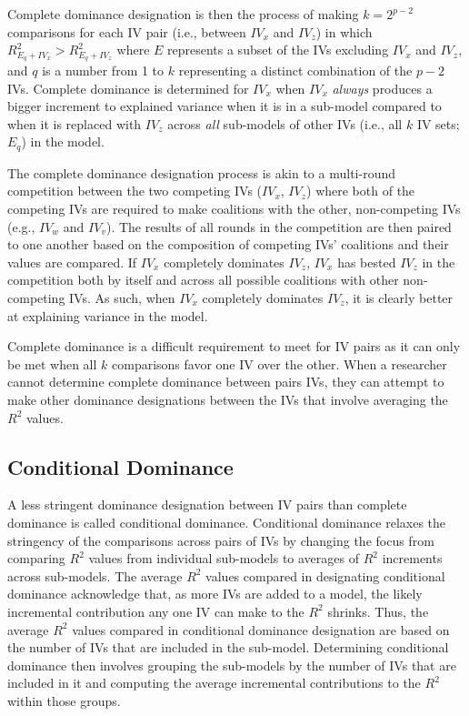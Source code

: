 \documentclass[ShortAfour,times,sageapa]{sagej}
\begin{document}
	Complete dominance designation is then the process of making $k = 2^{p - 2}$ comparisons for each IV pair (i.e., between $IV_x$ and $IV_z$) in which $R^2_{E_q + IV_x} > R^2_{E_q + IV_z}$ where $E$ represents a subset of the IVs excluding $IV_x$ and $IV_z$, and $q$ is a number from 1 to $k$ representing a distinct combination of the $p - 2$ IVs.
	Complete dominance is determined for $IV_x$ when $IV_x$ \emph{always} produces a bigger increment to explained variance when it is in a sub-model compared to when it is replaced with $IV_z$ across \emph{all} sub-models of other IVs (i.e., all $k$ IV sets; $E_q$) in the model. 
	
	The complete dominance designation process is akin to a multi-round competition between the two competing IVs ($IV_x$, $IV_z$) where both of the competing IVs are required to make coalitions with the other, non-competing IVs (e.g., $IV_w$ and $IV_v$). 
	The results of all rounds in the competition are then paired to one another based on the composition of competing IVs' coalitions and their values are compared.
	If $IV_x$ completely dominates $IV_z$, $IV_x$ has bested $IV_z$ in the competition both by itself and across all possible coalitions with other non-competing IVs. 
	As such, when $IV_x$ completely dominates $IV_z$, it is clearly better at explaining variance in the model.
	
	Complete dominance is a difficult requirement to meet for IV pairs as it can only be met when all $k$ comparisons favor one IV over the other.
	When a researcher cannot determine complete dominance between pairs IVs, they can attempt to make other dominance designations between the IVs that involve averaging the $R^2$ values.
	
	\subsection{Conditional Dominance}
	
	A less stringent dominance designation between IV pairs than complete dominance is called conditional dominance.
	Conditional dominance relaxes the stringency of the comparisons across pairs of IVs by changing the focus from comparing $R^2$ values from individual sub-models to averages of $R^2$ increments across sub-models.
	The average $R^2$ values compared in designating conditional dominance acknowledge that, as more IVs are added to a model, the likely incremental contribution any one IV can make to the $R^2$ shrinks.
	Thus, the average $R^2$ values compared in conditional dominance designation are based on the number of IVs that are included in the sub-model.	
	Determining conditional dominance then involves grouping the sub-models by the number of IVs that are included in it and computing the average incremental contributions to the $R^2$ within those groups.
	
\end{document}
